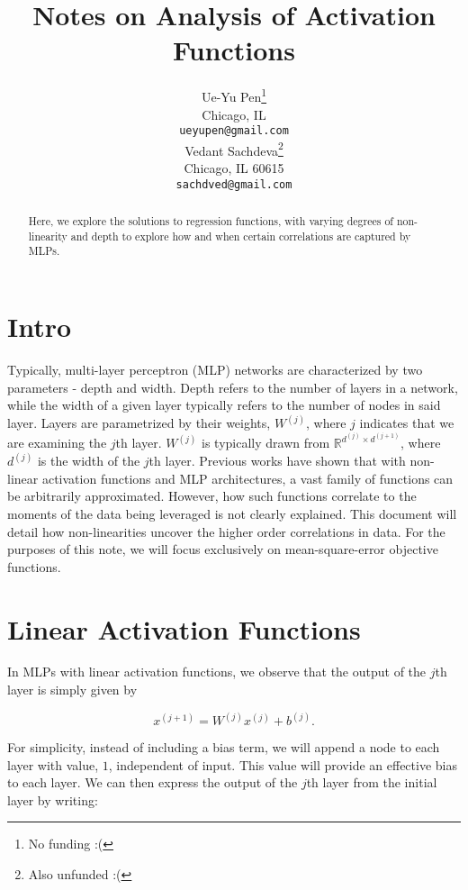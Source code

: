 \documentclass{article}
\title{Notes on Analysis of Activation Functions}
\author{%
  Ue-Yu Pen\thanks{No funding :(} \\
 Chicago, IL \\
  \texttt{ueyupen@gmail.com} \\
  \And
  Vedant Sachdeva\thanks{Also unfunded :(} \\
  Chicago, IL 60615 \\
  \texttt{sachdved@gmail.com}
}
\begin{document}
\maketitle


\begin{abstract}
Here, we explore the solutions to regression functions, with varying degrees of non-linearity and depth to explore how and when certain correlations are captured by MLPs.
\end{abstract}

\section{Intro}

Typically, multi-layer perceptron (MLP) networks are characterized by two parameters - depth and width. Depth refers to the number of layers in a network, while the width of a given layer typically refers to the number of nodes in said layer. Layers are parametrized by their weights, $W^{(j)}$, where $j$ indicates that we are examining the $j$th layer. $W^{(j)}$ is typically drawn from $\mathbb{R}^{d^{(j)} \times d^{(j+1)}}$, where $d^{(j)}$ is the width of the $j$th layer. Previous works have shown that with non-linear activation functions and MLP architectures, a vast family of functions can be arbitrarily approximated. However, how such functions correlate to the moments of the data being leveraged is not clearly explained. This document will detail how non-linearities uncover the higher order correlations in data. For the purposes of this note, we will focus exclusively on mean-square-error objective functions.

\section{Linear Activation Functions}

In MLPs with linear activation functions, we observe that the output of the $j$th layer is simply given by

\begin{equation}
x^{(j+1)} = W^{(j)}x^{(j)} + b^{(j)}.
\end{equation}

For simplicity, instead of including a bias term, we will append a node to each layer with value, $1$, independent of input. This value will provide an effective bias to each layer. We can then express the output of the $j$th layer from the initial layer by writing:
\end{document}

